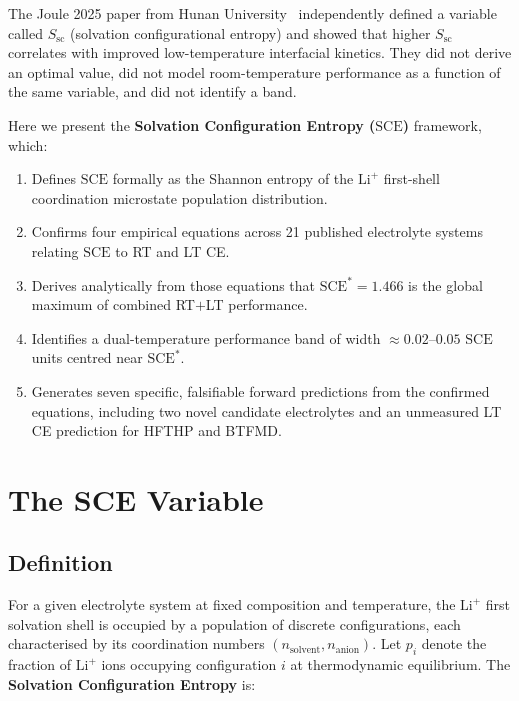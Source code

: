 \documentclass[12pt,letterpaper]{article}
\newcommand{\mSCE}{\mathrm{SCE}}
\newcommand{\mSCEstar}{\mathrm{SCE}^{*}}
\begin{document}
The Joule 2025 paper from Hunan
University~\cite{joule2025hunan} independently defined a
variable called $S_{\mathrm{sc}}$ (solvation
configurational entropy) and showed that higher
$S_{\mathrm{sc}}$ correlates with improved low-temperature
interfacial kinetics.
They did not derive an optimal value, did not model
room-temperature performance as a function of the same
variable, and did not identify a band.

Here we present the \textbf{Solvation Configuration
Entropy ($\mSCE$)} framework, which:

\begin{enumerate}
  \item Defines $\mSCE$ formally as the Shannon entropy
        of the $\mathrm{Li}^{+}$ first-shell coordination
        microstate population distribution.
  \item Confirms four empirical equations across 21
        published electrolyte systems relating $\mSCE$
        to RT and LT CE.
  \item Derives analytically from those equations that
        $\mSCEstar = 1.466$ is the global maximum of
        combined RT$+$LT performance.
  \item Identifies a dual-temperature performance band
        of width $\approx 0.02$--$0.05$ $\mSCE$ units
        centred near $\mSCEstar$.
  \item Generates seven specific, falsifiable forward
        predictions from the confirmed equations,
        including two novel candidate electrolytes and
        an unmeasured LT CE prediction for HFTHP
        and BTFMD.
\end{enumerate}

\section{The SCE Variable}
\label{sec:variable}

\subsection{Definition}
\label{sec:definition}

For a given electrolyte system at fixed composition and
temperature, the $\mathrm{Li}^{+}$ first solvation shell
is occupied by a population of discrete configurations,
each characterised by its coordination numbers
$(n_{\mathrm{solvent}}, n_{\mathrm{anion}})$.
Let $p_{i}$ denote the fraction of $\mathrm{Li}^{+}$
ions occupying configuration $i$ at thermodynamic
equilibrium.
The \textbf{Solvation Configuration Entropy} is:
\end{document}
